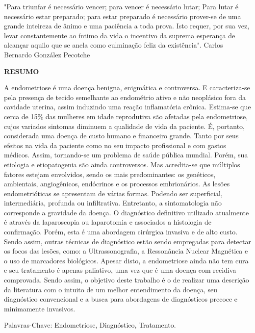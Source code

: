 \documentclass[12pt]{article} %
\begin{document}
"Para triunfar é necessário vencer; para vencer é necessário lutar;
Para lutar é necessário estar preparado; para estar preparado é necessário prover-se de uma grande inteireza de ânimo e uma paciência a toda prova. Isto requer, por sua vez, levar constantemente ao íntimo da vida o incentivo da suprema esperança de alcançar aquilo que se anela como culminação feliz da existência".
Carlos Bernardo González Pecotche 




\newpage
\begin{center}
\MakeUppercase{\textbf{Resumo}}
\end{center}
 \selectfont


A endometriose é uma doença benigna, enigmática e controversa. E
caracteriza-se pela presença de tecido semelhante ao endométrio ativo
e não neoplásico fora da cavidade uterina, assim induzindo uma reação
inflamatória crônica.
Estima-se que cerca de 15\% das mulheres em idade reprodutiva são
afetadas pela endometriose, cujos variados sintomas diminuem a
qualidade de vida da paciente. É, portanto, considerada uma doença de
custo humano e financeiro grande.  Tanto por seus efeitos na vida da
paciente como no seu impacto profissional e com gastos médicos.
Assim, tornando-se um problema de saúde pública mundial.
Porém, sua etiologia e etiopatogenia são ainda controversos. Mas
acredita-se que múltiplos fatores estejam envolvidos, sendo os mais
predominantes: os genéticos, ambientais, angiogênicos, endócrinos e
os processos embrionários.
As lesões endometrióticas se apresentam de várias formas. Podendo ser
superficial, intermediária, profunda ou infiltrativa. Entretanto, a
sintomatologia não corresponde a gravidade da doença. 
O diagnóstico definitivo utilizado atualmente é através da
laparoscopia ou laparotomia e associados a histologia de
confirmação. Porém, esta é uma abordagem cirúrgica invasiva e de alto
custo. Sendo assim, outras técnicas de diagnóstico estão sendo
empregadas para detectar os focos das lesões, como: a Ultrassonografia,
a Ressonância Nuclear Magnética e o uso de marcadores biológicos.
Apesar disto, a endometriose ainda não tem cura e seu tratamento é
apenas paliativo, uma vez que é uma doença com recidiva comprovada.
Sendo assim, o objetivo deste trabalho é o de realizar uma descrição
da literatura com o intuito de um melhor entendimento da doença, seu
diagnóstico convencional e a busca para abordagens de diagnósticos
precoce e minimamente invasivos.

Palavras-Chave: Endometriose, Diagnóstico, Tratamento.
\end{document}
